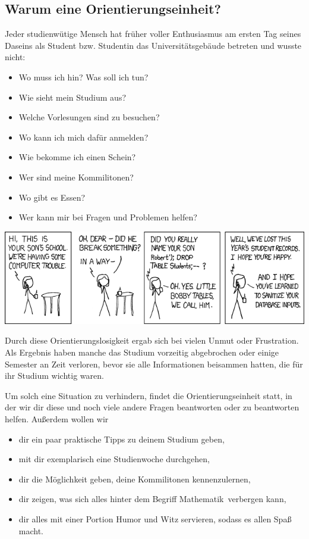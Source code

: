 \subsection{Warum eine Orientierungseinheit?}

Jeder studienwütige Mensch hat früher voller Enthusiasmus am ersten Tag seines
Daseins als Student bzw. Studentin das Universitätsgebäude betreten und wusste
nicht: 

\begin{itemize}\itemsep 0pt
    \item Wo muss ich hin? Was soll ich tun? 
    \item Wie sieht mein Studium aus?
    \item Welche Vorlesungen sind zu besuchen?
    \item Wo kann ich mich dafür anmelden?
    \item Wie bekomme ich einen Schein?
    \item Wer sind meine Kommilitonen?
    \item Wo gibt es Essen?
    \item Wer kann mir bei Fragen und Problemen helfen?
\end{itemize}

\begin{center}
\includegraphics[scale=.55]{comics/327}
\end{center}

Durch diese Orientierungslosigkeit ergab sich bei vielen Unmut oder
Frustration. Als Ergebnis haben manche das Studium vorzeitig abgebrochen oder
einige Semester an Zeit verloren, bevor sie alle Informationen beisammen
hatten, die für ihr Studium wichtig waren.

Um solch eine Situation zu verhindern, findet die Orientierungseinheit statt,
in der wir dir diese und noch viele andere Fragen beantworten oder zu
beantworten helfen.  Außerdem wollen wir 

\begin{itemize}\itemsep 0pt
    \item dir ein paar praktische Tipps zu deinem Studium geben,
    \item mit dir exemplarisch eine Studienwoche durchgehen,
    \item dir die Möglichkeit geben, deine Kommi\-litonen kennenzulernen, 
    \item dir zeigen, was sich alles hinter dem Begriff \glqq Mathematik\grqq\
          verbergen kann,
    \item dir alles mit einer Portion Humor und Witz servieren, sodass es allen
          Spaß macht.
\end{itemize}

